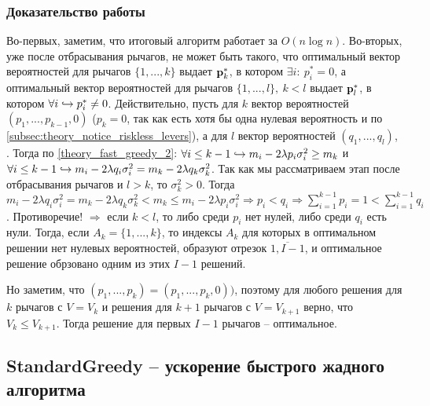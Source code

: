 \subsubsection{Доказательство работы}

Во-первых, заметим, что итоговый алгоритм работает за $O(n \log n)$. Во-вторых, уже после отбрасывания рычагов, не может быть такого, что оптимальный вектор вероятностей для рычагов $\{1,...,k\}$ выдает $\textbf{p}_k^*$, в котором $\exists i: \: p_i^* = 0$, а оптимальный вектор вероятностей для рычагов $\{1, ..., l\}, \: k < l$ выдает $\textbf{p}_l^*$, в котором $\forall i \hookrightarrow p_i^* \neq 0$. Действительно, пусть для $k$ вектор вероятностей $(p_1, ..., p_{k-1}, 0)$ ($p_k = 0$, так как есть хотя бы одна нулевая вероятность и по \ref{subsec:theory_notice_riskless_levers}), а для $l$ вектор вероятностей $(q_1, ..., q_l)$, . Тогда по \ref{theory_fast_greedy_2}: $\forall i \leq k - 1 \hookrightarrow m_i - 2 \lambda p_i \sigma_i^2 \geq m_k$ и $\forall i \leq k - 1 \hookrightarrow m_i - 2 \lambda q_i \sigma_i^2 = m_k - 2 \lambda q_k \sigma_k^2$. Так как мы рассматриваем этап после отбрасывания рычагов и $l > k$, то $\sigma_k^2 > 0$. Тогда $m_i - 2 \lambda q_i \sigma_i^2 = m_k - 2 \lambda q_k \sigma_k^2 < m_k \leq m_i - 2 \lambda p_i \sigma_i^2 \Rightarrow p_i < q_i \Rightarrow \sum_{i=1}^{k-1} p_i = 1 < \sum_{i=1}^{k-1} q_i$. Противоречие! $\Rightarrow$ если $k < l$, то либо среди $p_i$ нет нулей, либо среди $q_i$ есть нули. Тогда, если $A_k = \{1, ..., k\}$, то индексы $A_k$ для которых в оптимальном решении нет нулевых вероятностей, образуют отрезок $\overline{1, I - 1}$, и оптимальное решение обрзовано одним из этих $I - 1$ решений.

Но заметим, что $(p_1, ..., p_k) = (p_1, ..., p_{k}, 0))$, поэтому для любого решения для $k$ рычагов с $V = V_k$ и решения для $k+1$ рычагов с $V = V_{k+1}$ верно, что $V_k \leq V_{k+1}$. Тогда решение для первых $I - 1$ рычагов -- оптимальное.

\subsection{StandardGreedy -- ускорение быстрого жадного алгоритма}

